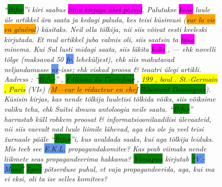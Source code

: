 \documentclass[runningheads]{llncs}
\begin{document}
\begin{figure}
  \centering
  \begin{minipage}{0.9\textwidth}
\itshape
  ``\colorbox{Green}{Bifur}''i kiri saabus \colorbox{Magenta}{Sinu kirjaga \"uhel p\"aeval}. Palutakse \colorbox{Magenta}{kohe} luule \"ule artikkel \"ara saata ja kedagi paluda, kes teisi k\"usimusi
  (\colorbox{Orange}{sur la vie en g\'en\'eral})
k\"asitaks. Neil olla t\~olkija, nii siis v\~oivat eesti keeleski kirjutada. Et mul artikkel juba valmis oli, siis saatsin ta \colorbox{Magenta}{t\"ana} minema. Kui Sul lusti midagi saata, siis l\"akita \colorbox{Magenta}{kohe} , --- ehk novelli t\~olge (maksavad 50 \colorbox{CornflowerBlue}{fr.} lehek\"uljest), ehk siis mahutavad neljandamasse \colorbox{CornflowerBlue}{nr}-isse; ehk viskad proosa \& teaatri \"ulegi artikli. Aadress : ``\colorbox{Green}{Bifur}'' , \colorbox{Green}{\'Editions du Carrefour} , \colorbox{Yellow}{199 , boul . St.-Germain , Paris} (VIe) (\colorbox{Orange}{M–--eur le r\'edacteur en chef}  \colorbox{Green}{Ribemont Dessaignes}). K\"usisin kirjas, kas nende t\~olkija luuletisi t\~olkida v\~oiks, siis v\~oiksime valiku teha, ehk Suitsi ilmuva antoloogia neile saata. ``\colorbox{Green}{Bifur}'' harrastab k\"ull rohkem proosat \& informatsioonilaadilisi \"ulevaateid, nii siis vaevalt nad luule liimile l\"ahevad, aga eks ole ju veel teisi \v{z}urnaale p\"a\"ale ``\colorbox{Green}{Bifur}''i, kus avaldada saaks, kui aga t\~olkija leiduks. Mis teeb see \colorbox{CornflowerBlue}{E.K.L.} propagandakomitee? Kas peab viimaks nende liikmete seas propagandeerima hakkama? \colorbox{Green}{Visnapuu} kirjutab \colorbox{Green}{``\colorbox{CornflowerBlue}{V.-M}aas''} \colorbox{Green}{Igori} p\"otserduse puhul, et vaja propagandeerida, aga, kui ma ei eksi, oli ta ise selles komitees?

  \end{minipage}
  
  \begin{minipage}{0.9\textwidth}
    \vspace{14pt}

\end{minipage}
\end{figure}
\end{document}
